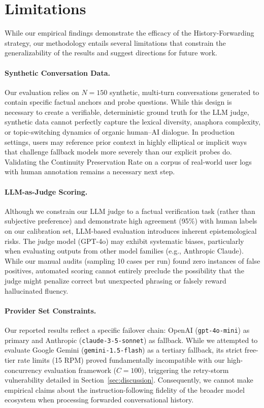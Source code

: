 \section{Limitations}
\label{sec:limitations}

While our empirical findings demonstrate the efficacy of the History-Forwarding strategy, our methodology entails several limitations that constrain the generalizability of the results and suggest directions for future work.

\paragraph{Synthetic Conversation Data.}
Our evaluation relies on $N=150$ synthetic, multi-turn conversations generated to contain specific factual anchors and probe questions. While this design is necessary to create a verifiable, deterministic ground truth for the LLM judge, synthetic data cannot perfectly capture the lexical diversity, anaphora complexity, or topic-switching dynamics of organic human--AI dialogue. In production settings, users may reference prior context in highly elliptical or implicit ways that challenge fallback models more severely than our explicit probes do. Validating the Continuity Preservation Rate on a corpus of real-world user logs with human annotation remains a necessary next step.

\paragraph{LLM-as-Judge Scoring.}
Although we constrain our LLM judge to a factual verification task (rather than subjective preference) and demonstrate high agreement (95\%) with human labels on our calibration set, LLM-based evaluation introduces inherent epistemological risks. The judge model (GPT-4o) may exhibit systematic biases, particularly when evaluating outputs from other model families (e.g., Anthropic Claude). While our manual audits (sampling 10 cases per run) found zero instances of false positives, automated scoring cannot entirely preclude the possibility that the judge might penalize correct but unexpected phrasing or falsely reward hallucinated fluency.

\paragraph{Provider Set Constraints.}
Our reported results reflect a specific failover chain: OpenAI (\texttt{gpt-4o-mini}) as primary and Anthropic (\texttt{claude-3-5-sonnet}) as fallback. While we attempted to evaluate Google Gemini (\texttt{gemini-1.5-flash}) as a tertiary fallback, its strict free-tier rate limits (15 RPM) proved fundamentally incompatible with our high-concurrency evaluation framework ($C=100$), triggering the retry-storm vulnerability detailed in Section~\ref{sec:discussion}. Consequently, we cannot make empirical claims about the instruction-following fidelity of the broader model ecosystem when processing forwarded conversational history.

